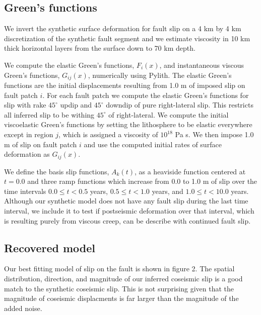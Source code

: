 \documentclass[extra]{gji}
\begin{document}
\subsection{Green's functions}

We invert the synthetic surface deformation for fault slip on a 4 km
by 4 km discretization of the synthetic fault segment and we estimate
viscosity in 10 km thick horizontal layers from the surface down to 70
km depth.

We compute the elastic Green's functions, $F_i(x)$, and instantaneous
viscous Green's functions, $G_{ij}(x)$, numerically using Pylith.  The
elastic Green’s functions are the initial displacements resulting from
1.0 m of imposed slip on fault patch $i$.  For each fault patch we
compute the elastic Green's functions for slip with rake $45^\circ$
updip and $45^\circ$ downdip of pure right-lateral slip.  This
restricts all inferred slip to be withing $45^\circ$ of
right-lateral. We compute the initial viscoelastic Green's functions
by setting the lithosphere to be elastic everywhere except in region
$j$, which is assigned a viscosity of $10^{18}$ Pa s.  We then impose
1.0 m of slip on fault patch $i$ and use the computed initial
rates of surface deformation as $G_{ij}(x)$.

We define the basis slip functions, $A_k(t)$, as a heaviside function
centered at $t=0.0$ and three ramp functions which increase from 0.0 to
1.0 m of slip over the time intervals $0.0\leq t < 0.5$ years,
$0.5\leq t < 1.0$ years, and $1.0\leq t < 10.0$ years.  Although our
synthetic model does not have any fault slip during the last time
interval, we include it to test if postseismic deformation over that
interval, which is resulting purely from viscous creep, can be
describe with continued fault slip.

\subsection{Recovered model}

Our best fitting model of slip on the fault is shown in figure 2.  The
spatial distribution, direction, and magnitude of our inferred
coseismic slip is a good match to the synthetic coseismic slip.  This
is not surprising given that the magnitude of coseismic displacments
is far larger than the magnitude of the added noise. 
\end{document}
